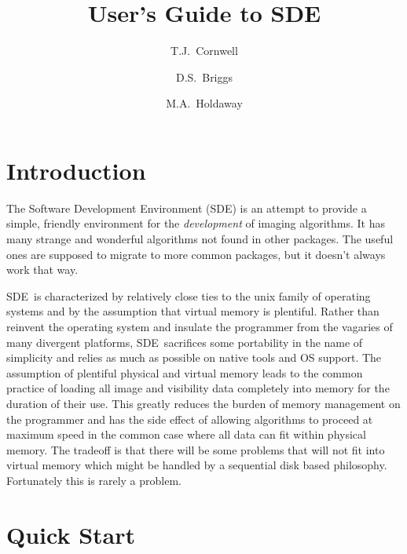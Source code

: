 \pagestyle{headings}
\setlength{\evensidemargin}{.25in}
\setlength{\oddsidemargin}{0.cm}
\setlength{\textwidth}{15.8cm}
\setlength{\topmargin}{0.cm}
\setlength{\textheight}{20cm}
%

\newcommand{\sde}{{\sf SDE}}
\newcommand{\aips}{${\cal AIPS}$}
\def\caret{\char`\^}
\title{User's Guide to \sde}
\author{T.J.~Cornwell
        \and D.S.~Briggs
	\and M.A.~Holdaway}
\maketitle
\tableofcontents
\cleardoublepage
\section{Introduction}

The Software Development Environment (\sde) is an attempt to provide a
simple, friendly environment for the {\em development} of imaging algorithms.
It has many strange and wonderful algorithms not found in other packages.
The useful ones are supposed to migrate to more common packages, but it
doesn't always work that way.

\sde\ is characterized by relatively close ties to the unix family of
operating systems and by the assumption that virtual memory is plentiful.
Rather than reinvent the operating system and insulate the programmer
from the vagaries of many divergent platforms, \sde\ sacrifices some
portability in the name of simplicity and relies as much as possible
on native tools and OS support.  The assumption of plentiful physical and
virtual memory leads to the common practice of loading all image and
visibility data completely into memory for the duration of their use.
This greatly reduces the burden of memory management on the programmer
and has the side effect of allowing algorithms to proceed at maximum
speed in the common case where all data can fit within physical memory.
The tradeoff is that there will be some problems that will not fit
into virtual memory which might be handled by a sequential disk based
philosophy.  Fortunately this is rarely a problem.

\newpage
\section{Quick Start}


